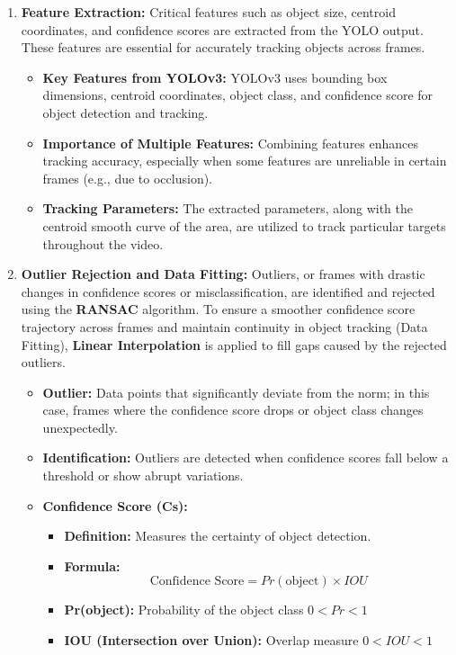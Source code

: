 {\begin{enumerate}
 \item \textbf{Feature Extraction:} Critical features such as object size, centroid coordinates, and confidence scores are extracted from the YOLO output. These features are essential for accurately tracking objects across frames.
  \begin{itemize}
      \item \textbf{Key Features from YOLOv3:} YOLOv3 uses bounding box dimensions, centroid coordinates, object class, and confidence score for object detection and tracking.
      \item \textbf{Importance of Multiple Features:} Combining features enhances tracking accuracy, especially when some features are unreliable in certain frames (e.g., due to occlusion).
      \item \textbf{Tracking Parameters:} The extracted parameters, along with the centroid smooth curve of the area, are utilized to track particular targets throughout the video.
  \end{itemize}
 \item \textbf{Outlier Rejection and Data Fitting:} Outliers, or frames with drastic changes in confidence scores or misclassification, are identified and rejected using the \textbf{RANSAC} algorithm. To ensure a smoother confidence score trajectory across frames and maintain continuity in object tracking (Data Fitting), \textbf{Linear Interpolation} is applied to fill gaps caused by the rejected outliers.
 \begin{itemize}
    \item \textbf{Outlier:} Data points that significantly deviate from the norm; in this case, frames where the confidence score drops or object class changes unexpectedly.
    \item \textbf{Identification:} Outliers are detected when confidence scores fall below a threshold or show abrupt variations.
    \item \textbf{Confidence Score (Cs):}
    \begin{itemize}
        \item \textbf{Definition:} Measures the certainty of object detection.
        \item \textbf{Formula:} 
        \[
        \text{Confidence Score} = Pr(\text{object}) \times IOU
        \]
        \item \textbf{Pr(object):} Probability of the object class \( 0 < Pr < 1 \)
        \item \textbf{IOU (Intersection over Union):} Overlap measure \( 0 < IOU < 1 \)

\end{itemize}
\end{itemize}
\end{enumerate}}
